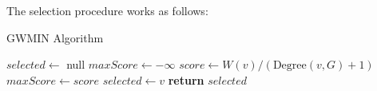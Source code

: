 The selection procedure works as follows:

\begin{algorithm}
    \caption{GWMIN Algorithm}
    \begin{algorithmic}[1]
            \State $selected \gets$ null
            \State $maxScore \gets -\infty$
                \State $score \gets W(v) / (\text{Degree}(v, G) + 1)$
                    \State $maxScore \gets score$
                    \State $selected \gets v$
                \EndIf
            \EndFor
            \State \textbf{return} $selected$
        \EndProcedure
    \end{algorithmic}\label{alg:algorithm-gwin-selection}
\end{algorithm}

